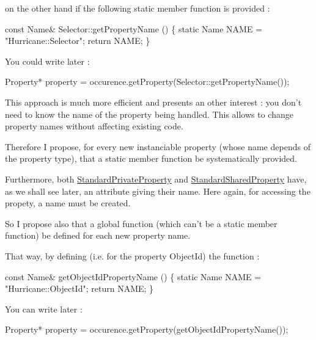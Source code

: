 on the other hand if the following static member function is provided \-: 
\begin{DoxyCode}
\textcolor{keyword}{const} Name& Selector::getPropertyName ()
\{
  \textcolor{keyword}{static} Name NAME = \textcolor{stringliteral}{"Hurricane::Selector"};
  \textcolor{keywordflow}{return} NAME;
\}
\end{DoxyCode}
 You could write later \-: 
\begin{DoxyCode}
Property* \textcolor{keyword}{property} = occurence.getProperty(Selector::getPropertyName());
\end{DoxyCode}
 This approach is much more efficient and presents an other interest \-: you don't need to know the name of the property being handled. This allows to change property names without affecting existing code.

Therefore I propose, for every new instanciable property (whose name depends of the property type), that a static member function be systematically provided.

Furthermore, both \hyperlink{classHurricane_1_1StandardPrivateProperty}{Standard\-Private\-Property} and \hyperlink{classHurricane_1_1StandardSharedProperty}{Standard\-Shared\-Property} have, as we shall see later, an attribute giving their name. Here again, for accessing the propety, a name must be created.

So I propose also that a global function (which can't be a static member function) be defined for each new property name.

That way, by defining (i.\-e. for the property Object\-Id) the function \-: 
\begin{DoxyCode}
\textcolor{keyword}{const} Name& getObjectIdPropertyName ()
\{
  \textcolor{keyword}{static} Name NAME = \textcolor{stringliteral}{"Hurricane::ObjectId"};
  \textcolor{keywordflow}{return} NAME;
\}
\end{DoxyCode}
 You can write later \-: 
\begin{DoxyCode}
Property* \textcolor{keyword}{property} = occurence.getProperty(getObjectIdPropertyName());
\end{DoxyCode}
 

